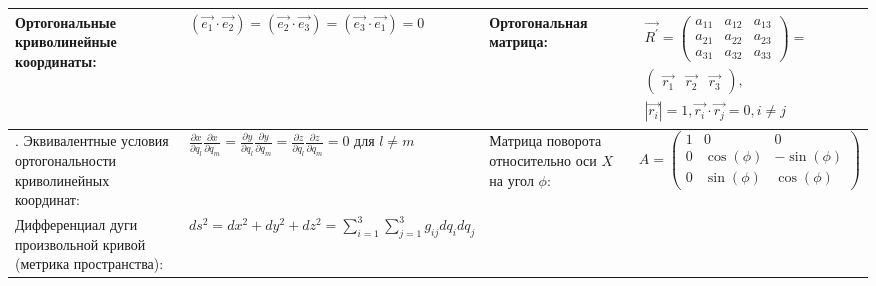 \documentclass{article}
\begin{document}
\begin{tabular}{ |p{3.8cm}|p{5.7cm}|p{3.8cm}|p{5.7cm}|  }
\hline
Ортогональные криволинейные координаты:                                      &  %
$(\vec{e_1} \cdot \vec{e_2}) = (\vec{e_2} \cdot \vec{e_3}) =
 (\vec{e_3} \cdot \vec{e_1}) = 0 $                                           &  %
Ортогональная матрица:                                                       &  %
$\begin{aligned}
\vec{R^{'}} =
\left(\begin{array}{ccc}
a_{11} & a_{12} & a_{13} \\
a_{21} & a_{22} & a_{23} \\
a_{31} & a_{32} & a_{33}
\end{array} \right) =                     \\
\left(\begin{array}{ccc}
\vec{r_{1}} & \vec{r_{2}} & \vec{r_{3}}
\end{array} \right),                      \\
|\vec{r_i}| = 1,
\vec{r_i} \cdot \vec{r_j} = 0, i \neq j
\end{aligned}$                                                               \\ %
\hline.
Эквивалентные условия ортогональности криволинейных координат:               &  %
$\frac{\partial x}{\partial q_l} \frac{\partial x}{\partial q_m} =
 \frac{\partial y}{\partial q_l} \frac{\partial y}{\partial q_m} =
 \frac{\partial z}{\partial q_l} \frac{\partial z}{\partial q_m} = 0$
для $l \neq m$                                                               &  %
Матрица поворота относительно оси $X$ на угол $\phi$:                        &  %
$A = \left(
\begin{array}{ccc}
1 & 0          & 0            \\
0 & \cos(\phi) & -\sin(\phi)  \\
0 & \sin(\phi) & \cos(\phi)
\end{array}
\right)$                                                                     \\ %
\hline
Дифференциал дуги произвольной кривой (метрика пространства):                &  %
$ds^2 = dx^2 + dy^2 + dz^2 =
\sum_{i = 1}^3 \sum_{j = 1}^3 g_{ij} dq_i dq_j$                              &  %


\end{tabular}
\end{document}
